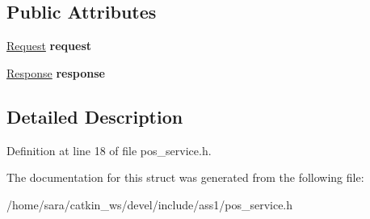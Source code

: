 \subsection*{Public Attributes}
\begin{DoxyCompactItemize}
\item 
\mbox{\label{structass1_1_1pos__service_a224d6c7c113a0f630fa83a4ffc642056}} 
\hyperlink{structass1_1_1pos__serviceRequest__}{Request} {\bfseries request}
\item 
\mbox{\label{structass1_1_1pos__service_a59f6142f98f03922675ce766d79a0dc8}} 
\hyperlink{structass1_1_1pos__serviceResponse__}{Response} {\bfseries response}
\end{DoxyCompactItemize}


\subsection{Detailed Description}


Definition at line 18 of file pos\+\_\+service.\+h.



The documentation for this struct was generated from the following file\+:\begin{DoxyCompactItemize}
\item 
/home/sara/catkin\+\_\+ws/devel/include/ass1/pos\+\_\+service.\+h\end{DoxyCompactItemize}
